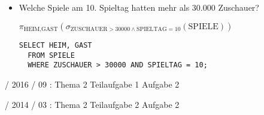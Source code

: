 \documentclass{lehramt-informatik-haupt}
\begin{document}
\begin{enumerate}
\begin{itemize}
%

\item Welche Spiele am 10. Spieltag hatten mehr als 30.000 Zuschauer?

\begin{antwort}
$\pi_{\text{HEIM,GAST}}(
  \sigma_{\text{ZUSCHAUER} > 30000 \land \text{SPIELTAG} = 10}(\text{SPIELE})
)$

\begin{verbatim}
SELECT HEIM, GAST
  FROM SPIELE
  WHERE ZUSCHAUER > 30000 AND SPIELTAG = 10;
\end{verbatim}
\end{antwort}
\end{itemize}
\end{enumerate}

%

 / 2016 / 09 : Thema 2 Teilaufgabe 1 Aufgabe 2

%

 / 2014 / 03 : Thema 2 Teilaufgabe 2 Aufgabe 2

\literatur
\end{document}
